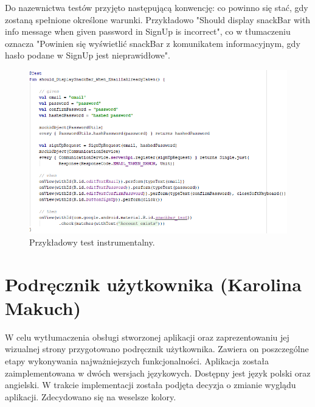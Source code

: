 \documentclass[10pt,twoside,a4paper]{report}
\begin{document}
Do nazewnictwa testów przyjęto następującą konwencję: co powinno się stać, gdy zostaną spełnione określone warunki. Przykładowo "Should display snackBar with info message when given password in SignUp is incorrect", co w tłumaczeniu oznacza "Powinien się wyświetlić snackBar z komunikatem informacyjnym, gdy hasło podane w SignUp jest nieprawidłowe".

\begin{figure}[h]
\centering
\includegraphics[width=\linewidth]{instrumentationTest}
\caption{Przykładowy test instrumentalny.}
\label{fig:instrumentationTest}
\end{figure}


\chapter{Podręcznik użytkownika (Karolina Makuch)}
\par W celu wytłumaczenia obsługi stworzonej aplikacji oraz zaprezentowaniu jej wizualnej strony przygotowano podręcznik użytkownika. Zawiera on poszczególne etapy wykonywania najważniejszych funkcjonalności.
Aplikacja została zaimplementowana w dwóch wersjach językowych. Dostępny jest język polski oraz angielski.
W trakcie implementacji została podjęta decyzja o zmianie wyglądu aplikacji. Zdecydowano się na weselsze kolory.
\end{document}
